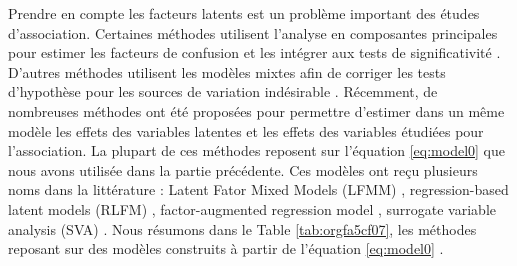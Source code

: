 \documentclass[12pt,a4paper,twoside]{ugathesis}
\begin{document}
Prendre en compte les facteurs latents est un problème important des études
d'association. Certaines méthodes utilisent l'analyse en composantes principales
pour estimer les facteurs de confusion et les intégrer aux tests de
significativité \citep{Rahmani_2016,Price_2006}. D'autres méthodes utilisent les
modèles mixtes afin de corriger les tests d'hypothèse pour les sources de
variation indésirable \citep{Kang_2008,Zhou_2014,Loh194944}. Récemment, de
nombreuses méthodes ont été proposées pour permettre d'estimer dans un même
modèle les effets des variables latentes et les effets des variables étudiées
pour l'association. La plupart de ces méthodes reposent sur l'équation
\eqref{eq:model0} que nous avons utilisée dans la partie précédente. Ces modèles
ont reçu plusieurs noms dans la littérature : Latent Fator Mixed Models (LFMM)
\citep{Frichot_2013}, regression-based latent models (RLFM)
\citep{agarwal09_regres}, factor-augmented regression model
\citep{gerard2017empirical}, surrogate variable analysis (SVA)
\citep{article_Leek_Storey_2007}. Nous résumons dans le Table
\ref{tab:orgfa5cf07}, les méthodes reposant sur des modèles construits à
partir de l'équation \eqref{eq:model0} .
\end{document}
